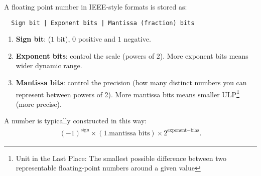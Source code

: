 \documentclass[11pt]{article}  %
\begin{document}
A floating point number in IEEE-style formats is stored as:
\begin{verbatim}
  Sign bit | Exponent bits | Mantissa (fraction) bits
\end{verbatim}
\begin{enumerate}
  \item \textbf{Sign bit}: ($1$ bit), $0$ positive and $1$ negative.
  \item \textbf{Exponent bits}: control the scale (powers of $2$). 
  More exponent bits means wider dynamic range.
  \item \textbf{Mantissa bits}: control the precision (how many distinct numbers you can represent between powers of 2). More mantissa bits means smaller ULP\footnote{Unit in the Last Place: The smallest possible difference between two representable floating-point numbers around a given value} (more precise).
\end{enumerate}
A number is typically constructed in this way:
\begin{align*}
  (-1)^{\text{sign}} \times (1.\text{mantissa bits}) \times 2^{\text{exponent} - \text{bias}}.
\end{align*}
\end{document}
